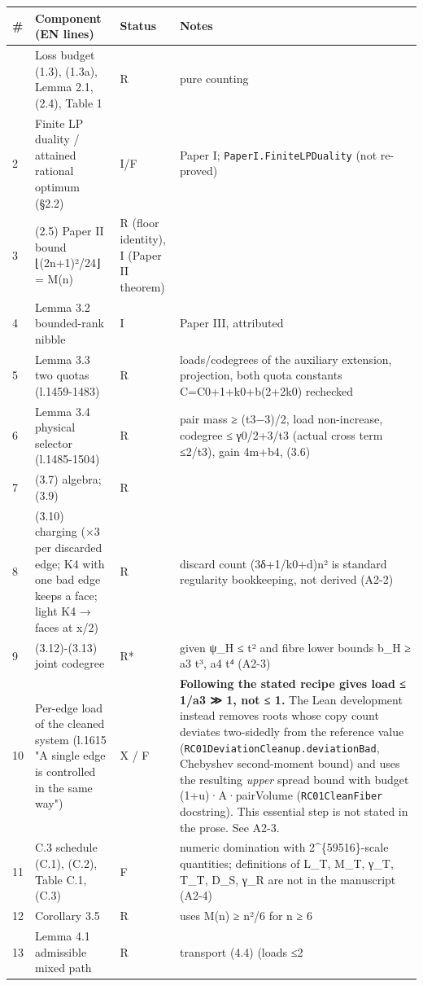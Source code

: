 \documentclass[
]{article}
\newcounter{none} %
\begin{document}
{\def\LTcaptype{none} %
\begin{longtable}[]{@{}llll@{}}
\toprule\noalign{}
\# & Component (EN lines) & Status & Notes \\
\midrule\noalign{}
\endhead
\bottomrule\noalign{}
\endlastfoot
1 & Loss budget (1.3), (1.3a), Lemma 2.1, (2.4), Table 1 & R & pure
counting \\
2 & Finite LP duality / attained rational optimum (§2.2) & I/F & Paper
I; \texttt{PaperI.FiniteLPDuality} (not re-proved) \\
3 & (2.5) Paper II bound ⌊(2n+1)²/24⌋ = M(n) & R (floor identity), I
(Paper II theorem) & \\
4 & Lemma 3.2 bounded-rank nibble & I & Paper III, attributed \\
5 & Lemma 3.3 two quotas (l.1459-1483) & R & loads/codegrees of the
auxiliary extension, projection, both quota constants C=C0+1+k0+b(2+2k0)
rechecked \\
6 & Lemma 3.4 physical selector (l.1485-1504) & R & pair mass ≥
(t3−3)/2, load non-increase, codegree ≤ γ0/2+3/t3 (actual cross term
≤2/t3), gain 4m+b4, (3.6) \\
7 & (3.7) algebra; (3.9) & R & \\
8 & (3.10) charging (×3 per discarded edge; K4 with one bad edge keeps a
face; light K4 → faces at x/2) & R & discard count (3δ+1/k0+d)n² is
standard regularity bookkeeping, not derived (A2-2) \\
9 & (3.12)-(3.13) joint codegree & R* & given ψ\_H ≤ t² and fibre lower
bounds b\_H ≥ a3 t³, a4 t⁴ (A2-3) \\
10 & Per-edge load of the cleaned system (l.1615 "A single edge is
controlled in the same way") & X / F & \textbf{Following the stated
recipe gives load ≤ 1/a3 ≫ 1, not ≤ 1.} The Lean development instead
removes roots whose copy count deviates two-sidedly from the reference
value (\texttt{RC01DeviationCleanup.deviationBad}, Chebyshev
second-moment bound) and uses the resulting \emph{upper} spread bound
with budget (1+u)·A·pairVolume (\texttt{RC01CleanFiber} docstring). This
essential step is not stated in the prose. See A2-3. \\
11 & C.3 schedule (C.1), (C.2), Table C.1, (C.3) & F & numeric
domination with 2\^{}\{59516\}-scale quantities; definitions of L\_T,
M\_T, γ\_T, T\_T, D\_S, γ\_R are not in the manuscript (A2-4) \\
12 & Corollary 3.5 & R & uses M(n) ≥ n²/6 for n ≥ 6 \\
13 & Lemma 4.1 admissible mixed path & R & transport (4.4) (loads ≤2

\end{longtable}}
\end{document}
